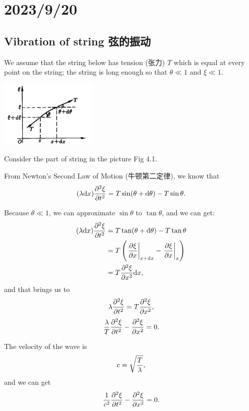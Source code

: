 \chapter{2023/9/20}\label{20230920}

\section{Vibration of string 弦的振动}\label{vibration-of-string-ux5f26ux7684ux632fux52a8}

We assume that the string below has tension (张力) \(T\) which is equal at every point on the string; the string is long enough so that \(\theta \ll 1\) and \(\xi \ll 1\).

\begin{center}
    \includegraphics[height=90pt]{../assets/Vibration_of_String.png}
\end{center}

Consider the part of string in the picture Fig 4.1.

From Newton's Second Law of Motion (牛顿第二定律), we know that \[(\lambda \mathrm dx) {\partial^2 \xi \over \partial t^2 } = T \sin(\theta + \mathrm d\theta) - T \sin \theta.\]

Because \(\theta \ll 1\), we can approximate \(\sin \theta\) to \(\tan \theta\), and we can get: \begin{align*}
    (\lambda \mathrm dx) {\partial^2 \xi \over \partial t^2 } & = T \tan(\theta + \mathrm d\theta) - T \tan \theta \\
    & = T \left( \left. {\partial \xi \over \partial x} \right\vert _{x+\mathrm dx} - \left. {\partial \xi \over \partial x} \right \vert _x \right)\\
    & = T {\partial^2 \xi \over \partial x^2 } \mathrm dx,
\end{align*} and that brings us to \[\lambda {\partial^2 \xi \over \partial t^2 } = T {\partial^2 \xi \over \partial x^2 },\] \[{\lambda \over T} {\partial^2 \xi \over \partial t^2 } - {\partial^2 \xi \over \partial x^2 } = 0.\]

The velocity of the wave is \[c = \sqrt{T \over \lambda},\] and we can get \[{1 \over c^2} {\partial^2 \xi \over \partial t^2 } - {\partial^2 \xi \over \partial x^2 } = 0.\]

